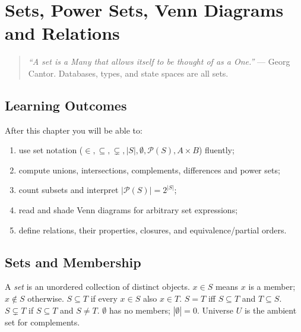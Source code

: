 \chapter[Sets]{Sets, Power Sets, Venn Diagrams and Relations}
\label{ch:sets}

\begin{quote}
\emph{``A set is a Many that allows itself to be thought of as a One.''} --- Georg Cantor. Databases, types, and state spaces are all sets.
\end{quote}

\noindent{}
\vspace{0.4em}

\section*{Learning Outcomes}
After this chapter you will be able to:
\begin{enumerate}[label=(L\arabic*)]
    \item use set notation ($\in,\subseteq,\subsetneq,|S|,\emptyset,\mathcal{P}(S),A\times B$) fluently;
    \item compute unions, intersections, complements, differences and power sets;
    \item count subsets and interpret $|\mathcal{P}(S)|=2^{|S|}$;
    \item read and shade Venn diagrams for arbitrary set expressions;
    \item define relations, their properties, closures, and equivalence/partial orders.
\end{enumerate}

\section{Sets and Membership}
\label{sec:sets-membership}
A \emph{set} is an unordered collection of distinct objects. $x\in S$ means $x$ is a member; $x\notin S$ otherwise. $S\subseteq T$ if every $x\in S$ also $x\in T$. $S=T$ iff $S\subseteq T$ and $T\subseteq S$. $S\subsetneq T$ if $S\subseteq T$ and $S\neq T$. $\emptyset$ has no members; $|\emptyset|=0$. Universe $U$ is the ambient set for complements.

